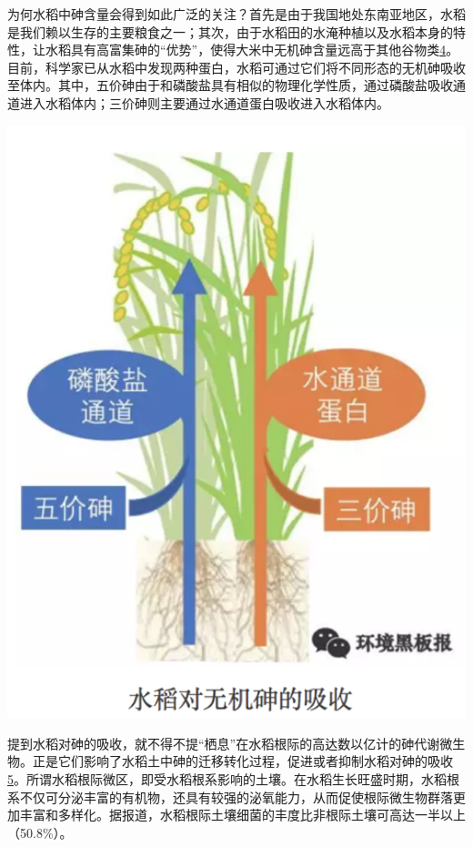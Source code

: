 \documentclass[]{book}
\begin{document}
为何水稻中砷含量会得到如此广泛的关注？首先是由于我国地处东南亚地区，水稻是我们赖以生存的主要粮食之一；其次，由于水稻田的水淹种植以及水稻本身的特性，让水稻具有高富集砷的``优势''，使得大米中无机砷含量远高于其他谷物类\href{Khan\%20S,\%20Cai\%20Chao,\%20et\%20al．\%20Environ.\%20Sci.\%20\&\%20Technol.,\%202013,\%2047\%20:\%208624-8632．}{4}。目前，科学家已从水稻中发现两种蛋白，水稻可通过它们将不同形态的无机砷吸收至体内。其中，五价砷由于和磷酸盐具有相似的物理化学性质，通过磷酸盐吸收通道进入水稻体内；三价砷则主要通过水通道蛋白吸收进入水稻体内。

\includegraphics[width=6.44in]{images/as3}

提到水稻对砷的吸收，就不得不提``栖息''在水稻根际的高达数以亿计的砷代谢微生物。正是它们影响了水稻土中砷的迁移转化过程，促进或者抑制水稻对砷的吸收\href{Bi\%20H,\%20Huang\%20X,\%20et\%20al.\%20Small\%202014,\%2010,\%203544.}{5}。所谓水稻根际微区，即受水稻根系影响的土壤。在水稻生长旺盛时期，水稻根系不仅可分泌丰富的有机物，还具有较强的泌氧能力，从而促使根际微生物群落更加丰富和多样化。据报道，水稻根际土壤细菌的丰度比非根际土壤可高达一半以上（50.8\%）。
\end{document}
